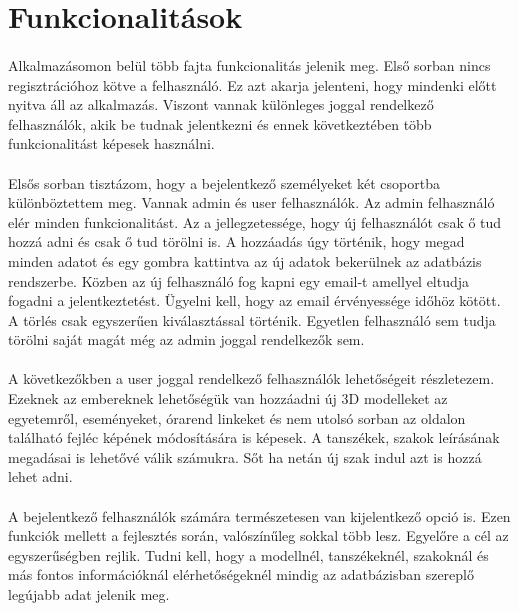 \section{Funkcionalitások}
	\paragraph{}
	Alkalmazásomon belül több fajta funkcionalitás jelenik meg. Első sorban nincs regisztrációhoz kötve a felhasználó. Ez azt akarja jelenteni, hogy mindenki előtt nyitva áll az alkalmazás. Viszont vannak különleges joggal rendelkező felhasználók, akik be tudnak jelentkezni és ennek következtében több funkcionalitást képesek használni.
	\paragraph{}
	Elsős sorban tisztázom, hogy a bejelentkező személyeket két csoportba különböztettem meg. Vannak admin és user felhasználók. Az admin felhasználó elér minden funkcionalitást. Az a jellegzetessége, hogy új felhasználót csak ő tud hozzá adni és csak ő tud törölni is. A hozzáadás úgy történik, hogy megad minden adatot és egy gombra kattintva az új adatok bekerülnek az adatbázis rendszerbe. Közben az új felhasználó fog kapni egy email-t amellyel eltudja fogadni a jelentkeztetést. Ügyelni kell, hogy az email érvényessége időhöz kötött. A törlés csak egyszerűen kiválasztással történik. Egyetlen felhasználó sem tudja törölni saját magát még az admin joggal rendelkezők sem.
	\paragraph{}
	A következőkben a user joggal rendelkező felhasználók lehetőségeit részletezem. Ezeknek az embereknek lehetőségük van hozzáadni új 3D modelleket az egyetemről, eseményeket, órarend linkeket és nem utolsó sorban az oldalon található fejléc képének módosítására is képesek. A tanszékek, szakok leírásának megadásai is lehetővé válik számukra. Sőt ha netán új szak indul azt is hozzá lehet adni.
	\paragraph{}
	A bejelentkező felhasználók számára természetesen van kijelentkező opció is. Ezen funkciók mellett a fejlesztés során, valószínűleg sokkal több lesz. Egyelőre a cél az egyszerűségben rejlik. Tudni kell, hogy a modellnél, tanszékeknél, szakoknál és más fontos információknál elérhetőségeknél mindig az adatbázisban szereplő legújabb adat jelenik meg. 
